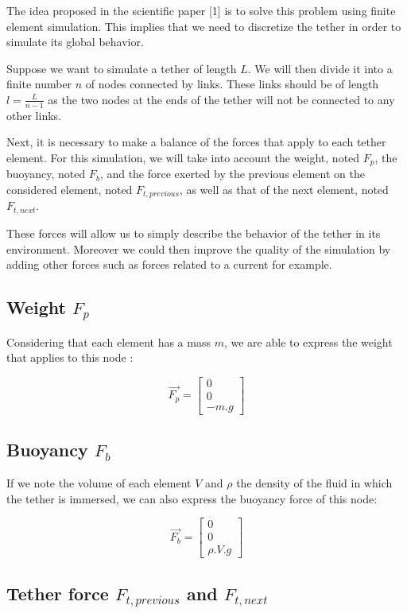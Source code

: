 The idea proposed in the scientific paper [1] is to solve this problem using finite element simulation. This implies that we need to discretize the tether in order to simulate its global behavior.

Suppose we want to simulate a tether of length $L$. We will then divide it into a finite number $n$ of nodes connected by links. These links should be of length $l=\frac{L}{n-1}$ as the two nodes at the ends of the tether will not be connected to any other links.

Next, it is necessary to make a balance of the forces that apply to each tether element. For this simulation, we will take into account the weight, noted $F_p$, the buoyancy, noted $F_b$, and the force exerted by the previous element on the considered element, noted $F_{t, previous}$, as well as that of the next element, noted $F_{t, next}$.

These forces will allow us to simply describe the behavior of the tether in its environment. Moreover we could then improve the quality of the simulation by adding other forces such as forces related to a current for example.

\subsection{Weight $F_p$}
Considering that each element has a mass $m$, we are able to express the weight that applies to this node :

$$\overrightarrow{F_p} = \begin{bmatrix}0\\ 0\\ -m.g\end{bmatrix}$$

\subsection{Buoyancy $F_b$}
If we note the volume of each element $V$ and $\rho$ the density of the fluid in which the tether is immersed, we can also express the buoyancy force of this node:

$$\overrightarrow{F_b} = \begin{bmatrix}0\\ 0\\ \rho.V.g\end{bmatrix}$$

\subsection{Tether force $F_{t, previous}$ and $F_{t, next}$}

